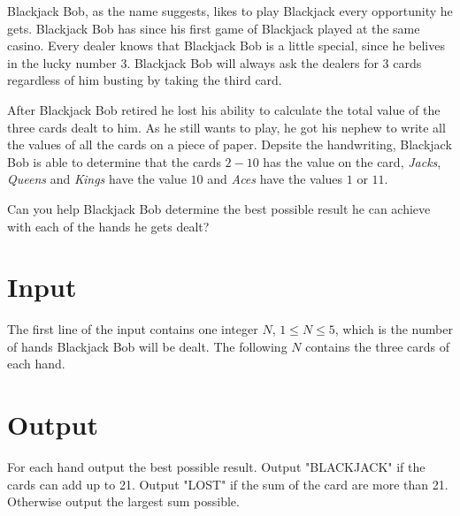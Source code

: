 Blackjack Bob, as the name suggests, likes to play Blackjack every opportunity he gets.
Blackjack Bob has since his first game of Blackjack played at the same casino. 
Every dealer knows that Blackjack Bob is a little special, since he belives in the lucky number $3$.
Blackjack Bob will always ask the dealers for 3 cards regardless of him busting by taking the third card.

After Blackjack Bob retired he lost his ability to calculate the total value of the three cards dealt to him.
As he still wants to play, he got his nephew to write all the values of all the cards on a piece of paper.
Depsite the handwriting, Blackjack Bob is able to determine that the cards $2-10$ has the value on the card, 
\textit{Jacks}, \textit{Queens} and \textit{Kings} have the value $10$ and \textit{Aces} have the values $1$ or $11$.

Can you help Blackjack Bob determine the best possible result he can achieve with each of the hands he gets dealt?

\section*{Input}

The first line of the input contains one integer $N$, $1 \leq N \leq 5$, which is the number of hands 
Blackjack Bob will be dealt. The following $N$ contains the three cards of each hand.


\section*{Output}

For each hand output the best possible result.
Output "BLACKJACK" if the cards can add up to 21.
Output "LOST" if the sum of the card are more than 21.
Otherwise output the largest sum possible.

